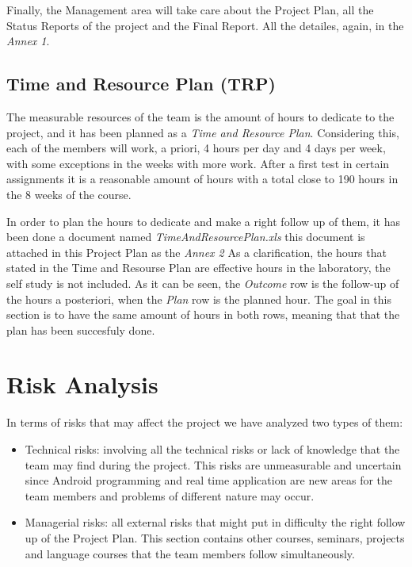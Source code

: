 \documentclass[11pt]{article}
\begin{document}
Finally, the Management area will take care about the Project Plan, all the Status Reports of the project and the Final Report. All the detailes, again, in the \textit{Annex 1}.

\subsection*{Time and Resource Plan (TRP)}
The measurable resources of the team is the amount of hours to dedicate to the project, and it has been planned as a \textit{Time and Resource Plan}. Considering this, each of the members will work, a priori, 4 hours per day and 4 days per week, with some exceptions in the weeks with more work. After a first test in certain assignments it is a reasonable amount of hours with a total close to 190 hours in the 8 weeks of the course.

In order to plan the hours to dedicate and make a right follow up of them, it has been done a document named \textit{TimeAndResourcePlan.xls} this document is attached in this Project Plan as the \textit{Annex 2} As a clarification, the hours that stated in the Time and Resourse Plan are effective hours in the laboratory, the self study is not included. As it can be seen, the \textit{Outcome} row is the follow-up of the hours a posteriori, when the \textit{Plan} row is the planned hour. The goal in this section is to have the same amount of hours in both rows, meaning that that the plan has been succesfuly done.

\section{Risk Analysis}

In terms of risks that may affect the project we have analyzed two types of them:

\begin{itemize}
\item Technical risks: involving all the technical risks or lack of knowledge that the team may find during the project. This risks are unmeasurable and uncertain since Android programming and real time application are new areas for the team members and problems of different nature may occur.

\item Managerial risks: all external risks that might put in difficulty the right follow up of the Project Plan. This section contains other courses, seminars, projects and language courses that the team members follow simultaneously.

\end{itemize}
\end{document}
